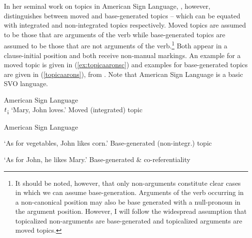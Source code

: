 In her seminal work on topics in American Sign Language, \citet{aarons1994aspects, aarons1996topics}, however, distinguishes between moved and base-generated topics -- which can be equated with integrated and non-integrated topics respectively. Moved topics are assumed to be those that are arguments of the verb while base-generated topics are assumed to be those that are not arguments of the verb.\footnote{ It should be noted, however, that only non-arguments constitute clear cases in which we can assume base-generation. Arguments of the verb occurring in a non-canonical position may also be base generated with a null-pronoun in the argument position. However, I will follow the widespread assumption that topicalized non-arguments are base-generated and topicalized arguments are moved topics.} Both appear in a clause-initial position and both receive non-manual markings. An example for a moved topic is given in (\ref{ex:topicaaronsc}) and examples for base-generated topics are given in (\ref{topicaarons}), from \citet{aarons1996topics}. Note that American Sign Language is a basic SVO language.

\begin{exe}
\ex American Sign Language \\   $\textrm{\textit{t}}$\textsubscript{i}
\glt `Mary, John loves.' \label{ex:topicaaronsc} \hfill Moved (integrated) topic
\end{exe} 


\begin{exe}
\ex American Sign Language \label{topicaarons}\begin{xlist} 
\ex {} 

\glt `As for vegetables, John likes corn.' \label{ex:topicaaronsa} \hfill Base-generated (non-integr.) topic

\ex {} 

\glt `As for John, he likes Mary.' \label{ex:topicaaronsb} \hfill Base-generated \& co-referentiality
\end{xlist}
\end{exe} 


